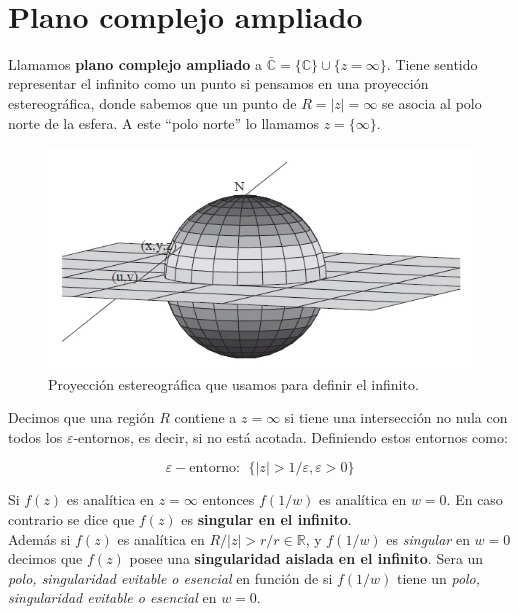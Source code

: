 \documentclass[12pt,a4paper]{book}
\begin{document}
\hrulefill \\

\section{Plano complejo ampliado}


Llamamos \textbf{plano complejo ampliado} a $\bar{\mathbb{C}} = \{ \mathbb{C} \} \cup \{  z = \infty \}$. Tiene sentido representar el infinito como un punto si pensamos en una proyección estereográfica, donde sabemos que un punto de $R=|z|=\infty$ se asocia al polo norte de la esfera. A este ``polo norte'' lo llamamos $z=\{ \infty \}$.\\

\begin{figure}[h!] \centering
\includegraphics[scale=0.5]{proyeccionestereografica.png}
\caption{Proyección estereográfica que usamos para definir el infinito.}
\end{figure}
 
Decimos que una región $R$ contiene a $z = \infty$ si tiene una intersección no nula con todos los $\varepsilon$-entornos, es decir, si no está acotada. Definiendo estos entornos como:

\begin{equation}
\varepsilon - \mathrm{entorno:} \ \ \{ |z|>1/\varepsilon, \varepsilon>0 \}
\end{equation}


Si $f(z)$ es analítica en $z=\infty$ entonces $f(1/w)$ es analítica en $w=0$. En caso contrario se dice que $f(z)$ es \textbf{singular en el infinito}. \\

Además si $f(z)$ es analítica en $R / |z| > r / r \in \mathbb{R}$, y $f(1/w)$ es \textit{singular} en $w=0$ decimos que $f(z)$ posee una \textbf{singularidad aislada en el infinito}. Sera un  \textit{polo, singularidad evitable o esencial} en función de si $f(1/w)$ tiene un \textit{polo, singularidad evitable o esencial} en $w=0$. \\
\end{document}
